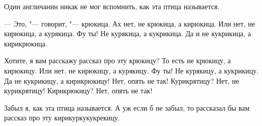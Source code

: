 Один англичанин никак не мог вспомнить, как эта птица называется.

--- Это, "--- говорит, "--- крюкица. Ах нет, не крюкица, а кирюкица. Или нет,
не кирюкица, а курякица. Фу ты! Не курякица, а кукрикица. Да и не кукрикица,
а кирикрюкица.

Хотите, я вам расскажу рассказ про эту крюкицу? То есть не крюкицу, а кирюкицу.
Или нет, не кирюкицу, а курякицу. Фу ты! Не курякицу, а кукрикицу. Да не
кукрикицу, а кирикрюкицу! Нет, опять не так! Курикрятицу? Нет, не курикрятицу!
Кирикрюкицу? Нет, опять не так!

Забыл я, как эта птица называется. А уж если б не забыл, то рассказал бы вам
рассказ про эту кирикуркукукрекицу.